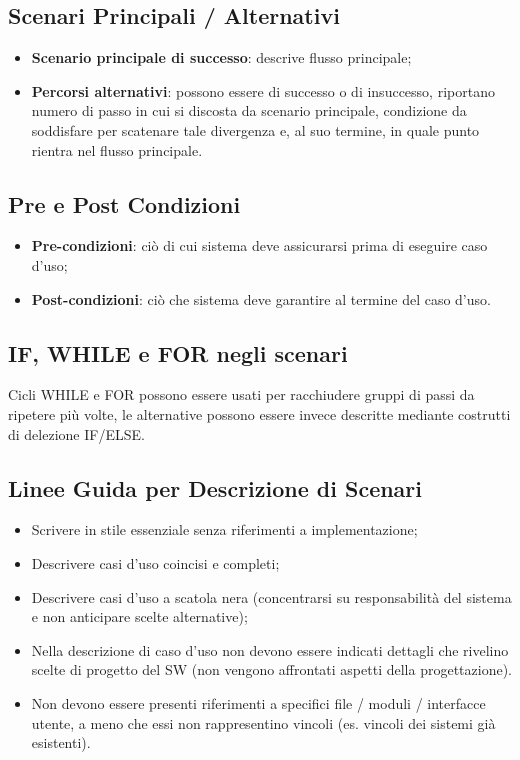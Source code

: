 \documentclass{article}
\begin{document}
    \subsection{Scenari Principali / Alternativi}
      \begin{itemize}
        \item \textbf{Scenario principale di successo}: descrive flusso principale; 
        \item \textbf{Percorsi alternativi}: possono essere di successo o di insuccesso, riportano numero di passo in cui si discosta da scenario principale, condizione da soddisfare per scatenare tale divergenza e, al suo termine, in quale punto rientra nel flusso principale.
      \end{itemize}
    \subsection{Pre e Post Condizioni}
      \begin{itemize}
        \item \textbf{Pre-condizioni}: ciò di cui sistema deve assicurarsi prima di eseguire caso d'uso; 
        \item \textbf{Post-condizioni}: ciò che sistema deve garantire al termine del caso d'uso.
      \end{itemize}
    \subsection{IF, WHILE e FOR negli scenari}
      Cicli WHILE e FOR possono essere usati per racchiudere gruppi di passi da ripetere più volte, le alternative possono essere invece descritte mediante costrutti di delezione IF/ELSE. 
    \subsection{Linee Guida per Descrizione di Scenari}
      \begin{itemize}
        \item Scrivere in stile essenziale senza riferimenti a implementazione; 
        \item Descrivere casi d'uso coincisi e completi;
        \item Descrivere casi d'uso a scatola nera (concentrarsi su responsabilità del sistema e non anticipare scelte alternative);
        \item Nella descrizione di caso d'uso non devono essere indicati dettagli che rivelino scelte di progetto del SW (non vengono affrontati aspetti della progettazione).
        \item Non devono essere presenti riferimenti a specifici file / moduli / interfacce utente, a meno che essi non rappresentino vincoli (es. vincoli dei sistemi già esistenti).
      \end{itemize}
\end{document}
